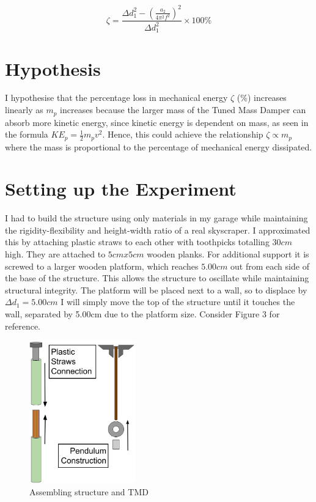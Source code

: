 \documentclass[11pt]{article}
\begin{document}
\begin{equation}
    \label{eqn:zeta}
    \zeta=\frac{\Delta d_1^2-(\frac{a_2}{4\pi^2f^2})^2}{\Delta d_1^2} \times 100\%
\end{equation}

\section{Hypothesis}
I hypothesise that the percentage loss in mechanical energy $\zeta$ (\%) increases linearly as $m_p$ increases because the larger mass of the Tuned Mass Damper can absorb more kinetic energy, since kinetic energy is dependent on mass, as seen in the formula $KE_p=\frac{1}{2}m_pv^2$. Hence, this could achieve the relationship $\zeta \propto m_p$ where the mass is proportional to the percentage of mechanical energy dissipated. 

\section{Setting up the Experiment}

I had to build the structure using only materials in my garage while maintaining the rigidity-flexibility and height-width ratio of a real skyscraper. I approximated this by attaching plastic straws to each other with toothpicks totalling $30cm$ high. They are attached to $5cm x 5cm$ wooden planks. For additional support it is screwed to a larger wooden platform, which reaches $5.00cm$ out from each side of the base of the structure. This allows the structure to oscillate while maintaining structural integrity. The platform will be placed next to a wall, so to displace by $\Delta d_1 = 5.00cm$ I will simply move the top of the structure until it touches the wall, separated by 5.00cm due to the platform size. Consider Figure 3 for reference.
\begin{figure}[h]
\centering
\includegraphics[width=130pt]{img/fig3.jpg}
\caption{\label{fig:3}Assembling structure and TMD}
\vspace{-10pt}
\end{figure}
\end{document}

